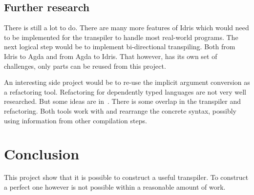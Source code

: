 \subsection{Further research}
There is still a lot to do. There are many more features of Idris which would
need to be implemented for the transpiler to handle most real-world programs.
The next logical step would be to implement bi-directional transpiling. Both
from Idris to Agda and from Agda to Idris. That however, has its own set of
challenges, only parts can be reused from this project.

An interesting side project would be to re-use the implicit argument conversion
as a refactoring tool. Refactoring for dependently typed languages are not very
well researched. But some ideas are in~\cite{wibergh2019}. There is some
overlap in the transpiler and refactoring. Both tools work with and rearrange
the concrete syntax, possibly using information from other compilation steps.


\section{Conclusion}

This project show that it is possible to construct
a useful transpiler. To construct a perfect one however is not possible within
a reasonable amount of work.


